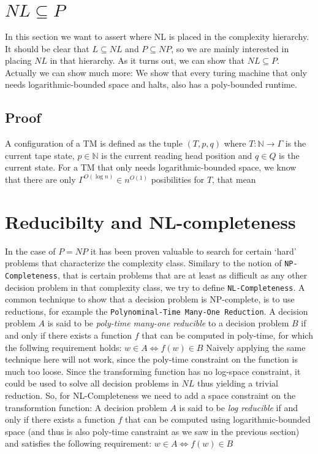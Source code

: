 \section{$NL \subseteq P$}\label{nl-subseteq-p}

In this section we want to assert where NL is placed in the complexity
hierarchy. It should be clear that $L \subseteq NL$ and
$P \subseteq NP$, so we are mainly interested in placing $NL$ in that
hierarchy. As it turns out, we can show that $NL \subseteq P$. Actually
we can show much more: We show that every turing machine that only needs
logarithmic-bounded space and halts, also has a poly-bounded runtime.

\subsection{Proof}\label{proof}

A configuration of a TM is defined as the tuple $(T, p, q)$ where
$T: \mathbb{N} \longrightarrow \Gamma$ is the current tape state,
$p \in \mathbb{N}$ is the current reading head position and $q \in Q$ is
the current state. For a TM that only needs logarithmic-bounded space,
we know that there are only $\Gamma^{O(\log n)} \in n^{O(1)}$
posibilities for $T$, that mean

\section{Reducibilty and
NL-completeness}\label{reducibilty-and-nl-completeness}

In the case of $P = NP$ it has been proven valuable to search for
certain `hard' problems that characterize the complexity class. Similary
to the notion of \texttt{NP-Completeness}, that is certain problems that
are at least as difficult as any other decision problem in that
complexity class, we try to define \texttt{NL-Completeness}. A common
technique to show that a decision problem is NP-complete, is to use
reductions, for example the
\texttt{Polynominal-Time Many-One Reduction}. A decision problem $A$ is
said to be \emph{poly-time many-one reducible} to a decision problem $B$
if and only if there exists a function $f$ that can be computed in
poly-time, for which the follwing requirement holds:
$w \in A \Leftrightarrow f(w) \in B$ Naively applying the same technique
here will not work, since the poly-time constraint on the function is
much too loose. Since the transforming function has no log-space
constraint, it could be used to solve all decision problems in $NL$ thus
yielding a trivial reduction. So, for NL-Completeness we need to add a
space constraint on the transformtion function: A decision problem $A$
is said to be \emph{log reducible} if and only if there exists a
function $f$ that can be computed using logarithmic-bounded space (and
thus is also poly-time canstraint as we saw in the previous section) and
satisfies the following requirement:
$w \in A \Leftrightarrow f(w) \in B$

